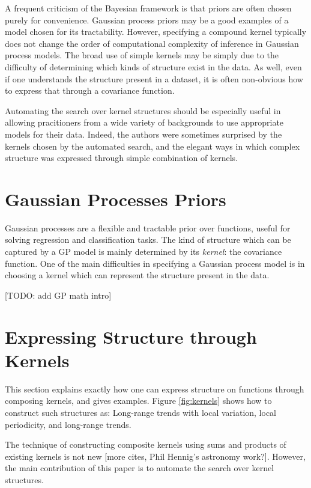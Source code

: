 \documentclass[twoside]{article}
\begin{document}
A frequent criticism of the Bayesian framework is that priors are often chosen purely for convenience.
Gaussian process priors may be a good examples of a model chosen for its tractability.
However, specifying a compound kernel typically does not change the order of computational complexity of inference in Gaussian process models.
The broad use of simple kernels may be simply due to the difficulty of determining which kinds of structure exist in the data.
As well, even if one understands the structure present in a dataset, it is often non-obvious how to express that through a covariance function.

Automating the search over kernel structures should be especially useful in allowing pracitioners from a wide variety of backgrounds to use appropriate models for their data.
Indeed, the authors were sometimes surprised by the kernels chosen by the automated search, and the elegant ways in which complex structure was expressed through simple combination of kernels.


\section{Gaussian Processes Priors}

Gaussian processes are a flexible and tractable prior over functions, useful for solving regression and classification tasks\cite{rasmussen38gaussian}.
The kind of structure which can be captured by a GP model is mainly determined by its \emph{kernel}: the covariance function.
One of the main difficulties in specifying a Gaussian process model is in choosing a kernel which can represent the structure present in the data.

[TODO: add GP math intro]

\section{Expressing Structure through Kernels}



This section explains exactly how one can express structure on functions through composing kernels, and gives examples.  
Figure \ref{fig:kernels} shows how to construct such structures as:  Long-range trends with local variation, local periodicity, and long-range trends.
%


%
The technique of constructing composite kernels using sums and products of existing kernels is not new \cite{rasmussen38gaussian} [more cites, Phil Hennig's astronomy work?].  
However, the main contribution of this paper is to automate the search over kernel structures.
\end{document}
